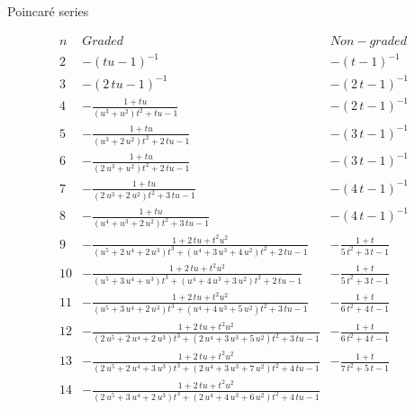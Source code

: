 \documentclass[reqno,10pt]{amsart}
\theoremstyle{definition}
\theoremstyle{remark}
\theoremstyle{plain}
\begin{document}
\begin{section}{Poincar{\'e} series}
\begin{figure}[p]
  \begin{center}
    \leavevmode
\begin{displaymath}
\begin{array}{|r|c|c|}
  \hline
  n & Graded & Non-graded \\ \hline
2 &-\left (tu-1\right )^{-1}
& -\left (t-1\right )^{-1}
\\
3 &
-\left (2\,tu-1\right )^{-1}
&
-\left (2\,t-1\right )^{-1}
\\
4 &
-{\frac {1+tu}{\left ({u}^{3}+{u}^{2}\right ){t}^{2}+tu-1}}
&
-\left (2\,t-1\right )^{-1}
\\
5 &
-{\frac {1+tu}{\left ({u}^{3}+2\,{u}^{2}\right ){t}^{2}+2\,tu-1}}
&
-\left (3\,t-1\right )^{-1}
\\
6 &
-{\frac {1+tu}{\left (2\,{u}^{3}+{u}^{2}\right ){t}^{2}+2\,tu-1}}
&
-\left (3\,t-1\right )^{-1}
\\
7 &
-{\frac {1+tu}{\left (2\,{u}^{3}+2\,{u}^{2}\right ){t}^{2}+3\,tu-1}}
&
-\left (4\,t-1\right )^{-1}
\\
8 &
-{\frac {1+tu}{\left ({u}^{4}+{u}^{3}+2\,{u}^{2}\right ){t}^{2}+3\,tu-
1}}
&
-\left (4\,t-1\right )^{-1}
\\
9 &
-{\frac {1+2\,tu+{t}^{2}{u}^{2}}{\left ({u}^{5}+2\,{u}^{4}+2\,{u}^{3}
\right ){t}^{3}+\left ({u}^{4}+3\,{u}^{3}+4\,{u}^{2}\right ){t}^{2}+2
\,tu-1}}
&
-{\frac {1+t}{5\,{t}^{2}+3\,t-1}}
\\
10 &
-{\frac {1+2\,tu+{t}^{2}{u}^{2}}{\left ({u}^{5}+3\,{u}^{4}+{u}^{3}
\right ){t}^{3}+\left ({u}^{4}+4\,{u}^{3}+3\,{u}^{2}\right ){t}^{2}+2
\,tu-1}}
&
-{\frac {1+t}{5\,{t}^{2}+3\,t-1}}
\\
11 &
-{\frac {1+2\,tu+{t}^{2}{u}^{2}}{\left ({u}^{5}+3\,{u}^{4}+2\,{u}^{3}
\right ){t}^{3}+\left ({u}^{4}+4\,{u}^{3}+5\,{u}^{2}\right ){t}^{2}+3
\,tu-1}}
&
-{\frac {1+t}{6\,{t}^{2}+4\,t-1}}
\\
12 &
-{\frac {1+2\,tu+{t}^{2}{u}^{2}}{\left (2\,{u}^{5}+2\,{u}^{4}+2\,{u}^{
3}\right ){t}^{3}+\left (2\,{u}^{4}+3\,{u}^{3}+5\,{u}^{2}\right ){t}^{
2}+3\,tu-1}}
&
-{\frac {1+t}{6\,{t}^{2}+4\,t-1}}
\\
13 &
-{\frac {1+2\,tu+{t}^{2}{u}^{2}}{\left (2\,{u}^{5}+2\,{u}^{4}+3\,{u}^{
3}\right ){t}^{3}+\left (2\,{u}^{4}+3\,{u}^{3}+7\,{u}^{2}\right ){t}^{
2}+4\,tu-1}}
&
-{\frac {1+t}{7\,{t}^{2}+5\,t-1}}
\\
14 &
-{\frac {1+2\,tu+{t}^{2}{u}^{2}}{\left (2\,{u}^{5}+3\,{u}^{4}+2\,{u}^{
3}\right ){t}^{3}+\left (2\,{u}^{4}+4\,{u}^{3}+6\,{u}^{2}\right ){t}^{
2}+4\,tu-1}}
&

\end{array}
\end{displaymath}
\end{center}
\end{figure}
\end{section}
\end{document}

